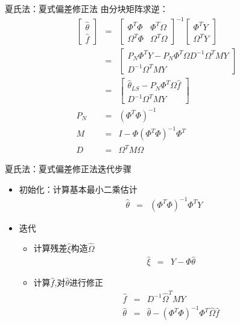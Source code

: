 \begin{frame}{夏氏法：夏式偏差修正法}
由分块矩阵求逆：
\begin{eqnarray*}
\begin{bmatrix}\hat\theta \\ \hat f \end{bmatrix} &=& \begin{bmatrix}\Phi^T\Phi & \Phi^T\Omega \\ \Omega^T\Phi & \Omega^T\Omega \end{bmatrix}^{-1}\begin{bmatrix}\Phi^T Y \\ \Omega^T Y\end{bmatrix} \\
&=& \begin{bmatrix}P_N \Phi^T Y - P_N\Phi^T \Omega D^{-1} \Omega^T M Y \\ D^{-1}\Omega^T M Y\end{bmatrix} \\
&=& \begin{bmatrix}\hat\theta_{LS} - P_N\Phi^T \Omega \hat f \\ D^{-1}\Omega^T M Y\end{bmatrix} \\
P_N &=& (\Phi^T\Phi)^{-1} \\
M &=& I-\Phi(\Phi^T\Phi)^{-1}\Phi^T \\
D &=& \Omega^T M \Omega
\end{eqnarray*}
\end{frame}


\begin{frame}{夏氏法：夏式偏差修正法迭代步骤}
\begin{itemize}
\item 初始化：计算基本最小二乘估计
\begin{eqnarray*}
\hat\theta &=& (\Phi^T\Phi)^{-1} \Phi^T Y
\end{eqnarray*}
\item 迭代
\begin{itemize}
\item 计算残差$\hat\xi$构造$\hat\Omega$
\begin{eqnarray*}
\hat\xi &=& Y- \Phi\hat\theta
\end{eqnarray*}
\item 计算$\hat f$,对$\hat\theta$进行修正
\begin{eqnarray*}
\hat f &=& D^{-1}\hat\Omega^T M Y \\
\hat\theta &=& \hat\theta-(\Phi^T\Phi)^{-1} \Phi^T \hat\Omega \hat f
\end{eqnarray*}
\end{itemize}
\end{itemize}
\end{frame}

